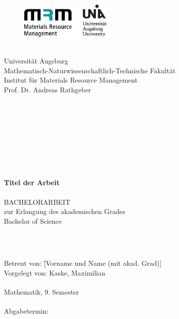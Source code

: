 \thispagestyle{empty}



\begin{figure}

\includegraphics[width=0.4\textwidth]{Bilder/logos.eps}



\end{figure}
$\;$\\
Universität Augsburg\\
Mathematisch-Naturwissenschaftlich-Technische Fakultät\\
Institut für Materials Resource Management\\
Prof. Dr. Andreas Rathgeber\\
$\;$\\
$\;$\\
$\;$\\
$\;$\\
$\;$\\
$\;$\\
$\;$\\
$\;$\\
\begin{spacing}{1.5}
\begin{center}
\huge\textbf{Titel der Arbeit}\\

$\;$\\


\Large BACHELORARBEIT\\
\Large zur Erlangung des akademischen Grades\\
\Large \glqq Bachelor of Science\grqq \\
\end{center}
$\;$\\
$\;$\\

\normalsize
\begin{tabbing}
Betreut von: \quad \=[Vorname und Name (mit akad. Grad)]\\


Vorgelegt von: \>Kaske, Maximilian\\
\\
\>Mathematik, 9. Semester\\
\\


Abgabetermin: \>[tt.mm.jjjj]
\end{tabbing}
\end{spacing}

